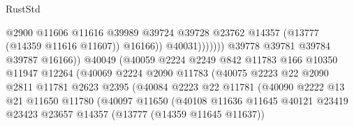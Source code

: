 \begin{lexlean}{RustStd}
\begin{coremodule}
                                                  @2900
                                                  @11606
                                                  @11616
                                                  @39989
                                                  @39724
                                                  @39728
                                                  @23762
                                                  @14357
                                                  (@13777 (@14359 @11616 @11607))
                                                  @16166))
                                              @40031)))))))
                                @39778
                                @39781
                                @39784
                                @39787
                                @16166))
                            @40049
                            (@40059
                              @2224
                              @2249
                              @842
                              @11783
                              @166
                              @10350
                              @11947
                              @12264
                              (@40069
                                @2224
                                @2090
                                @11783
                                (@40075
                                  @2223
                                  @22
                                  @2090
                                  @2811
                                  @11781
                                  @2623
                                  @2395
                                  (@40084
                                    @2223
                                    @22
                                    @11781
                                    (@40090
                                      @2222
                                      @13
                                      @21
                                      @11650
                                      @11780
                                      (@40097
                                        @11650
                                        (@40108
                                          @11636
                                          @11645
                                          @40121
                                          @23419
                                          @23423
                                          @23657
                                          @14357
                                          (@13777 (@14359 @11645 @11637))

\end{coremodule}
\end{lexlean}
